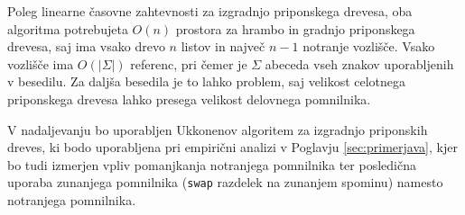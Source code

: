 Poleg linearne časovne zahtevnosti za izgradnjo priponskega drevesa, oba algoritma potrebujeta $O(n)$ prostora za hrambo in gradnjo priponskega drevesa, saj ima vsako drevo $n$ listov in največ $n-1$ notranje vozlišče. Vsako vozlišče ima $O(|\Sigma|)$ referenc, pri čemer je $\Sigma$ abeceda vseh znakov uporabljenih v besedilu. Za daljša besedila je to lahko problem, saj velikost celotnega priponskega drevesa lahko presega velikost delovnega pomnilnika.

V nadaljevanju bo uporabljen Ukkonenov algoritem za izgradnjo priponskih dreves, ki bodo uporabljena pri empirični analizi v Poglavju \ref{sec:primerjava}, kjer bo tudi izmerjen vpliv pomanjkanja notranjega pomnilnika ter posledična uporaba zunanjega pomnilnika (\verb|swap| razdelek na zunanjem spominu) namesto notranjega pomnilnika.